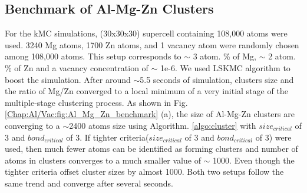 \subsection{Benchmark of Al-Mg-Zn Clusters}
\label{Chap:Al/Vac:benchmark}
For the \ac{kMC} simulations, (30x30x30) supercell containing 108,000 atoms were used. 3240 Mg atoms, 1700 Zn atoms, and 1 vacancy atom were randomly chosen among 108,000 atoms. This setup corresponds to $\sim$ 3 atom. \% of Mg, $\sim$ 2 atom. \% of Zn and a vacancy concentration of $\sim$ 1e-6. We used \ac{LSKMC} algorithm to boost the simulation. After around $\sim$5.5 seconds of simulation, clusters size and the ratio of Mg/Zn converged to a local minimum of a very initial stage of the multiple-stage clustering process. As shown in Fig. \ref{Chap:Al/Vac:fig:Al_Mg_Zn_benchmark} (a), the size of Al-Mg-Zn clusters are converging to a $\sim$2400 atoms size using Algorithm. \ref{algo:cluster} with $size_{critical}$ of 3 and $bond_{critical}$ of 3. If tighter criteria($size_{critical}$ of 3 and $bond_{critical}$ of 3) were used, then much fewer atoms can be identified as forming clusters and number of atoms in clusters converges to a much smaller value of $\sim$ 1000. Even though the tighter criteria offset cluster sizes by almost 1000. Both two setups follow the same trend and converge after several seconds.


